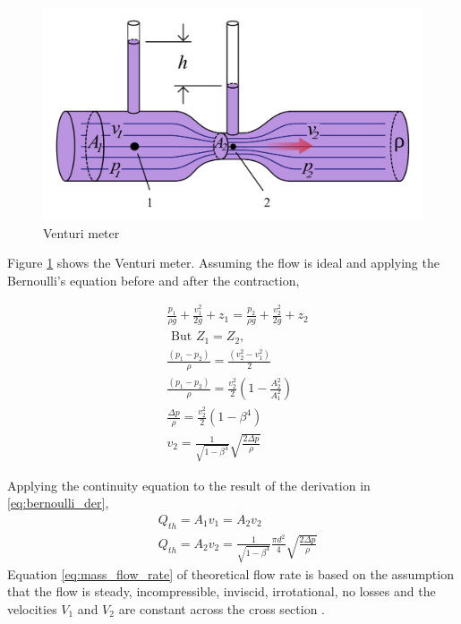 \begin{figure}
    \centering
    \includegraphics[width=0.6\linewidth]{Figures/venturi.png}
    \caption[Venturi Meter]{Venturi meter \cite{venturi_meter}}
    \label{fig:venturi}
\end{figure}

Figure \ref{fig:venturi} shows the Venturi meter. Assuming the flow is ideal and applying the Bernoulli's equation before and after the contraction, 

\begin{equation}
\begin{aligned}
&\frac{p_{1}}{\rho g}+\frac{v_{1}^{2}}{2 g}+z_{1}=\frac{p_{2}}{\rho g}+\frac{v_{2}^{2}}{2 g}+z_{2} \\
&\text { But } Z_{1}=Z_{2}, \\
&\frac{\left(p_{1}-p_{2}\right)}{\rho}=\frac{\left(v_{2}^{2}-v_{1}^{2}\right)}{2} \\
&\frac{\left(p_{1}-p_{2}\right)}{\rho}=\frac{v_{2}^{2}}{2}\left(1-\frac{A_{2}^{2}}{A_{1}^{2}}\right) \\
&\frac{\Delta p}{\rho}=\frac{v_{2}^{2}}{2}\left(1-\beta^{4}\right) \\
&v_{2}=\frac{1}{\sqrt{1-\beta^{4}}} \sqrt{\frac{2 \Delta p}{\rho}}
\end{aligned}
\label{eq:bernoulli_der}
\end{equation}

Applying the continuity equation to the result of the derivation in \ref{eq:bernoulli_der},
\begin{equation}
\begin{aligned}
&Q_{t h}=A_{1} v_{1}=A_{2} v_{2} \\
&Q_{t h}=A_{2} v_{2}=\frac{1}{\sqrt{1-\beta^{4}}} \frac{\pi d^{2}}{4} \sqrt{\frac{2 \Delta p}{\rho}}
\end{aligned}
\label{eq:mass_flow_rate}
\end{equation}
Equation \ref{eq:mass_flow_rate} of theoretical flow rate is based on the assumption that the flow is steady, incompressible, inviscid, irrotational, no losses and the velocities $V_{1}$ and  $V_{2}$ are constant across the cross section \cite{arun2015prediction}. 

